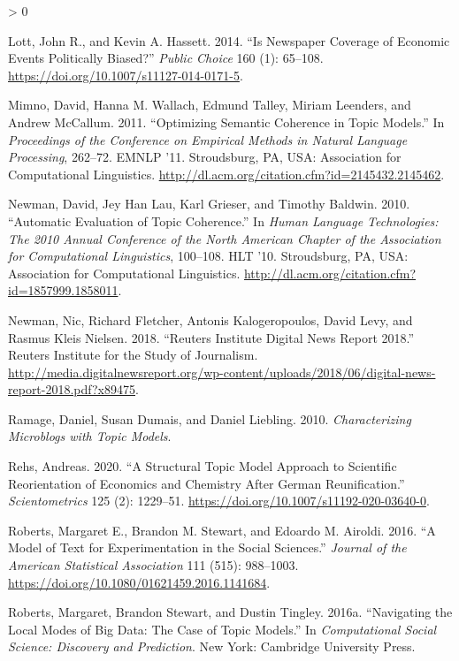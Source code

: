 \documentclass[
]{article}
\newlength{\cslhangindent}
\newenvironment{CSLReferences}[2] %
 {%
  \setlength{\parindent}{0pt}
  \ifodd #1 \everypar{\setlength{\hangindent}{\cslhangindent}}\ignorespaces\fi
  \ifnum #2 > 0
  \setlength{\parskip}{#2\baselineskip}
  \fi
 }%
 {}
\begin{document}
\begin{CSLReferences}{1}{0}
\leavevmode\hypertarget{ref-lott_is_2014}{}%
Lott, John R., and Kevin A. Hassett. 2014. {``Is Newspaper Coverage of
Economic Events Politically Biased?''} \emph{Public Choice} 160 (1):
65--108. \url{https://doi.org/10.1007/s11127-014-0171-5}.

\leavevmode\hypertarget{ref-mimno_optimizing_2011}{}%
Mimno, David, Hanna M. Wallach, Edmund Talley, Miriam Leenders, and
Andrew McCallum. 2011. {``Optimizing Semantic Coherence in Topic
Models.''} In \emph{Proceedings of the Conference on Empirical Methods
in Natural Language Processing}, 262--72. {EMNLP} '11. Stroudsburg,
{PA}, {USA}: Association for Computational Linguistics.
\url{http://dl.acm.org/citation.cfm?id=2145432.2145462}.

\leavevmode\hypertarget{ref-newman_automatic_2010}{}%
Newman, David, Jey Han Lau, Karl Grieser, and Timothy Baldwin. 2010.
{``Automatic Evaluation of Topic Coherence.''} In \emph{Human Language
Technologies: The 2010 Annual Conference of the North American Chapter
of the Association for Computational Linguistics}, 100--108. {HLT} '10.
Stroudsburg, {PA}, {USA}: Association for Computational Linguistics.
\url{http://dl.acm.org/citation.cfm?id=1857999.1858011}.

\leavevmode\hypertarget{ref-newman_reuters_2018}{}%
Newman, Nic, Richard Fletcher, Antonis Kalogeropoulos, David Levy, and
Rasmus Kleis Nielsen. 2018. {``Reuters Institute Digital News Report
2018.''} Reuters Institute for the Study of Journalism.
\url{http://media.digitalnewsreport.org/wp-content/uploads/2018/06/digital-news-report-2018.pdf?x89475}.

\leavevmode\hypertarget{ref-ramage_characterizing_2010}{}%
Ramage, Daniel, Susan Dumais, and Daniel Liebling. 2010.
\emph{Characterizing Microblogs with Topic Models}.

\leavevmode\hypertarget{ref-rehs_structural_2020}{}%
Rehs, Andreas. 2020. {``A Structural Topic Model Approach to Scientific
Reorientation of Economics and Chemistry After German Reunification.''}
\emph{Scientometrics} 125 (2): 1229--51.
\url{https://doi.org/10.1007/s11192-020-03640-0}.

\leavevmode\hypertarget{ref-roberts_model_2016}{}%
Roberts, Margaret E., Brandon M. Stewart, and Edoardo M. Airoldi. 2016.
{``A Model of Text for Experimentation in the Social Sciences.''}
\emph{Journal of the American Statistical Association} 111 (515):
988--1003. \url{https://doi.org/10.1080/01621459.2016.1141684}.

\leavevmode\hypertarget{ref-roberts_navigating_2016}{}%
Roberts, Margaret, Brandon Stewart, and Dustin Tingley. 2016a.
{``Navigating the Local Modes of Big Data: The Case of Topic Models.''}
In \emph{Computational Social Science: Discovery and Prediction}. New
York: Cambridge University Press.


\end{CSLReferences}
\end{document}
